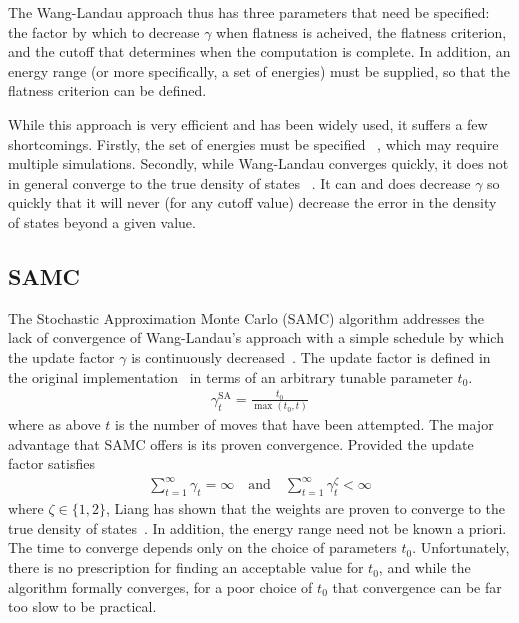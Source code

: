 \documentclass[letterpaper,twocolumn,amsmath,amssymb,pre,aps,10pt]{revtex4-1}
\begin{document}
The Wang-Landau approach thus has three parameters that need be
specified: the factor by which to decrease $\gamma$ when flatness is
acheived, the flatness criterion, and the cutoff that determines when
the computation is complete.  In addition, an energy range (or more
specifically, a set of energies) must be supplied, so that the
flatness criterion can be defined.

While this approach
is very efficient and has been widely used, it suffers a few
shortcomings.  Firstly, the set of energies must be specified
~\cite{wang2001efficient, schulz2003avoiding, yan2003fast}, which may
require multiple simulations. Secondly, while Wang-Landau converges quickly,
it does not in general converge to the true density of states
~\cite{belardinelli2008analysis, zhou2008optimal}.  It can and does decrease
$\gamma$ so quickly that it will never (for any cutoff value) decrease the
error in the density of states beyond a given value.

\subsection{SAMC}
The Stochastic Approximation Monte Carlo (SAMC) algorithm addresses
the lack of convergence of Wang-Landau's approach with a simple
schedule by which the update factor $\gamma$ is continuously
decreased~\cite{liang2007stochastic, werlich2015stochastic,
  schneider2017convergence}.  The update factor is defined in the
original implementation~\cite{liang2007stochastic} in terms of an
arbitrary tunable parameter $t_0$.
\begin{align}
\gamma_{t}^{\text{SA}} =\frac{t_0}{\max(t_0,t)}
\end{align}
where as above $t$ is the number of moves that have been attempted.
The major advantage that SAMC offers is its proven convergence.
Provided the update factor satisfies
\begin{align}
\sum_{t=1}^\infty \gamma_{t} = \infty \quad\textrm{and}\quad
\sum_{t=1}^\infty \gamma_{t}^\zeta < \infty
\end{align}
where $\zeta \in \{1,2\}$, Liang has shown that the weights are proven
to converge to the true density of states~\cite{liang2006theory,
  liang2007stochastic}.  In addition, the energy range need not be
known a priori.  The time to converge depends only on the choice of
parameters $t_0$.  Unfortunately, there is no
prescription for finding an acceptable value for $t_0$, and
while the algorithm formally converges, for a poor choice of $t_0$
that convergence can be far too slow to be practical.
\end{document}

